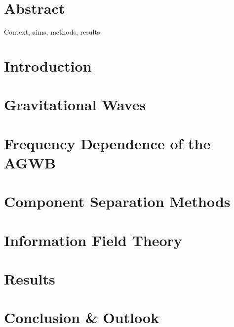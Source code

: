 \documentclass[twoside, 11pt, openany]{book}
\let\chaptername\relax
\begin{document}
                

\chapter*{Abstract}
Context, aims, methods, results


\newpage
\begin{spacing}{1}
\tableofcontents
{}
\end{spacing}
\newpage

\pagestyle{fancy}
\renewcommand{\chaptermark}[1]{\markboth{#1}{#1}}
\fancyhead[R]{}
\fancyhead[L]{\MakeUppercase{\chaptername\ \thechapter\ --\ \leftmark} \newline
                \vspace{-0.7cm}
                \noindent\rule{\linewidth}{0.4pt}}
\chapter{Introduction}


\chapter{Gravitational Waves}
\label{gw_chapter}


\chapter{Frequency Dependence of the AGWB}
\label{frequency_chapter}


\chapter{Component Separation Methods}
\label{comp_sep}


\chapter{Information Field Theory}
\label{ift_chapter}


\chapter{Results}
\label{results_chapter}


\chapter{Conclusion \& Outlook}
\label{conclusion_chapter}


\appendix







\newpage
{}
\printbibliography
\end{document}
